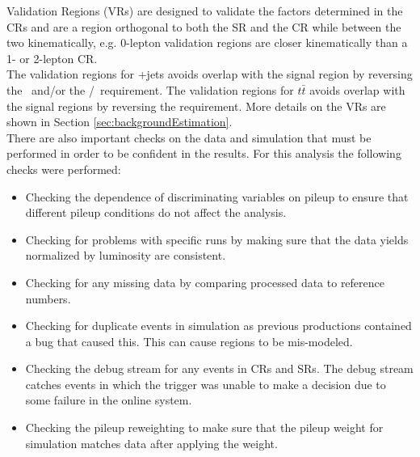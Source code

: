 
%
%

Validation Regions (VRs) are designed to validate the factors determined in the CRs and are a region orthogonal to both the SR and the CR while between the two kinematically, e.g. 0-lepton validation regions are closer kinematically than a 1- or 2-lepton CR.  \\

The validation regions for \Zboson +jets avoids overlap with the signal region by reversing the \drbjetbjet\ and/or the \mantikttwelvezero/\mantikteightzero\ requirement.  The validation regions for $t\bar{t}$ avoids overlap with the signal regions by reversing the \mtbmin requirement.  More details on the VRs are shown in Section \ref{sec:backgroundEstimation}.  \\



There are also important checks on the data and simulation that must be performed in order to be confident in the results.  For this analysis the following checks were performed:

\begin{itemize}
	\item Checking the dependence of discriminating variables on pileup to ensure that different pileup conditions do not affect the analysis.  
	\item Checking for problems with specific runs by making sure that the data yields normalized by luminosity are consistent.
	\item Checking for any missing data by comparing processed data to reference numbers.  
	\item Checking for duplicate events in simulation as previous productions contained a bug that caused this.  This can cause regions to be mis-modeled.
	\item Checking the debug stream for any events in CRs and SRs.  The debug stream catches events in which the trigger was unable to make a decision due to some failure in the online system.
	\item Checking the pileup reweighting to make sure that the pileup weight for simulation matches data after applying the weight.
\end{itemize}

